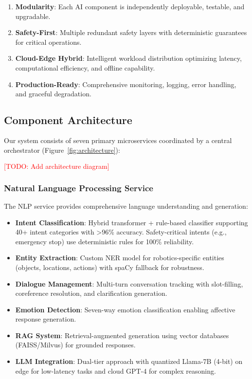 \documentclass[conference]{IEEEtran}
\newcommand{\todo}[1]{\textcolor{red}{[TODO: #1]}}
\begin{document}
\begin{enumerate}
    \item \textbf{Modularity}: Each AI component is independently deployable, testable, and upgradable.
    \item \textbf{Safety-First}: Multiple redundant safety layers with deterministic guarantees for critical operations.
    \item \textbf{Cloud-Edge Hybrid}: Intelligent workload distribution optimizing latency, computational efficiency, and offline capability.
    \item \textbf{Production-Ready}: Comprehensive monitoring, logging, error handling, and graceful degradation.
\end{enumerate}

\subsection{Component Architecture}

Our system consists of seven primary microservices coordinated by a central orchestrator (Figure~\ref{fig:architecture}):

\todo{Add architecture diagram}

\subsubsection{Natural Language Processing Service}

The NLP service provides comprehensive language understanding and generation:

\begin{itemize}
    \item \textbf{Intent Classification}: Hybrid transformer + rule-based classifier supporting 40+ intent categories with >96\% accuracy. Safety-critical intents (e.g., emergency stop) use deterministic rules for 100\% reliability.
    
    \item \textbf{Entity Extraction}: Custom NER model for robotics-specific entities (objects, locations, actions) with spaCy fallback for robustness.
    
    \item \textbf{Dialogue Management}: Multi-turn conversation tracking with slot-filling, coreference resolution, and clarification generation.
    
    \item \textbf{Emotion Detection}: Seven-way emotion classification enabling affective response generation.
    
    \item \textbf{RAG System}: Retrieval-augmented generation using vector databases (FAISS/Milvus) for grounded responses.
    
    \item \textbf{LLM Integration}: Dual-tier approach with quantized Llama-7B (4-bit) on edge for low-latency tasks and cloud GPT-4 for complex reasoning.
\end{itemize}
\end{document}
